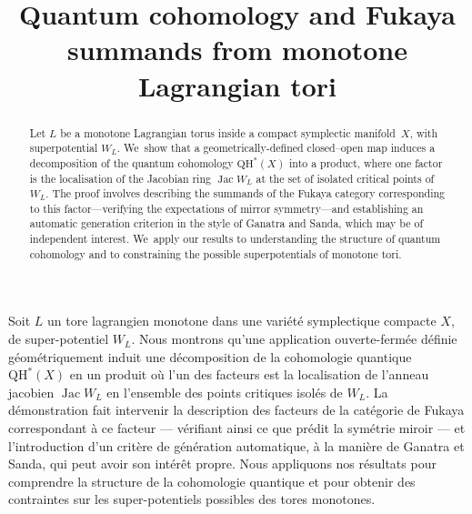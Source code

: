 \documentclass[JEP,XML,SOM,Unicode,NoEqCountersInSection,NoFloatCountersInSection,published]{cedram}
\theoremstyle{definition}
\begin{document}
\frontmatter

\title{Quantum cohomology and Fukaya summands from monotone Lagrangian tori}

\author[\initial{J.} \lastname{Smith}]{ }
\address{St John's College,\\
Cambridge, CB2 1TP, United Kingdom}

\begin{abstract}
Let $L$ be a monotone Lagrangian torus inside a compact symplectic manifold~$X$, with superpotential $W_L$. We~show that a geometrically-defined closed--open map induces a decomposition of the quantum cohomology $\mathrm{QH}^*(X)$ into a product, where one factor is the localisation of the Jacobian ring $\operatorname{Jac} W_L$ at the set of isolated critical points of $W_L$. The proof involves describing the summands of the Fukaya category corresponding to this factor---verifying the expectations of mirror symmetry---and establishing an automatic generation criterion in the style of Ganatra and Sanda, which may be of independent interest. We~apply our results to understanding the structure of quantum cohomology and to constraining the possible superpotentials of monotone tori.
\end{abstract}





\begin{altabstract}
Soit $L$ un tore lagrangien monotone dans une variété symplectique compacte $X$, de super-potentiel $W_L$. Nous montrons qu'une application ouverte-fermée définie géométriquement induit une décomposition de la cohomologie quantique $\mathrm{QH}^*(X)$ en un produit où l'un des facteurs est la localisation de l'anneau jacobien $\operatorname{Jac} W_L$ en l'ensemble des points critiques isolés de $W_L$. La démonstration fait intervenir la description des facteurs de la catégorie de Fukaya correspondant à ce facteur --- vérifiant ainsi ce que prédit la symétrie miroir --- et l'introduction d'un critère de génération automatique, à la manière de Ganatra et Sanda, qui peut avoir son intérêt propre. Nous appliquons nos résultats pour comprendre la structure de la cohomologie quantique et pour obtenir des contraintes sur les super-potentiels possibles des tores monotones.
\end{altabstract}
\end{document}
